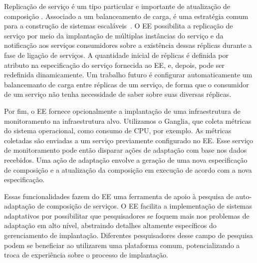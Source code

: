 \begin{description}
Replicação de serviço é um tipo particular e importante de atualização de composição
.
Associado a um balanceamento de carga, é uma estratégia comum para
a construção de sistemas escaláveis~\cite{Amazon2012Practices}.
O EE possibilita a replicação de serviço por meio da implantação de
múltiplas instâncias do serviço e da notificação aos serviços consumidores
sobre a existência dessas réplicas durante a fase de ligação de serviços.
A quantidade inicial de réplicas é definida por atributo na especificação
do serviço fornecida ao EE, e, depois, pode ser redefinida dinamicamente.
Um trabalho futuro é configurar automaticamente um balancemanto de carga
entre réplicas de um serviço, de forma que o consumidor de um serviço
não tenha necessidade de saber sobre suas diversas réplicas.

Por fim, o EE fornece opcionalmente a implantação de uma infraestrutura de monitoramento na infraestrutura alvo.
Utilizamos o Ganglia, que coleta métricas do sistema operacional, como consumo de CPU, por exemplo.
As métricas coletadas são enviadas a um serviço previamente configurado no EE.
Esse serviço de monitoramento pode então disparar ações de adaptação com base
nos dados recebidos. Uma ação de adaptação envolve a geração de uma nova especificação
de composição e a atualização da composição em execução de acordo com a nova especificação.

Essas funcionalidades fazem do EE uma ferramenta de apoio 
à pesquisa de auto-adaptação de composição de serviços.
O EE facilita a implementação de sistemas adaptativos
por possibilitar que pesquisadores se foquem mais nos problemas de adaptação em
alto nível, abstraindo detalhes altamente específicos do gerenciamento de implantação.
Diferentes pesquisadores desse campo de pesquisa podem se beneficiar ao utilizarem uma plataforma comum,
potencializando a troca de experiência sobre o processo de implantação. 


\end{description}

